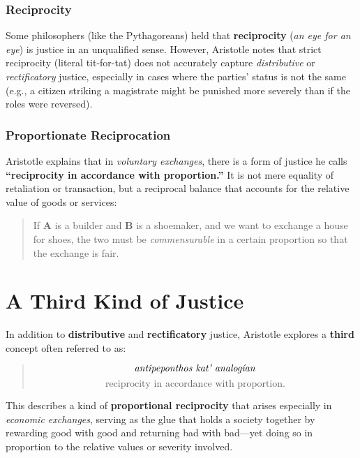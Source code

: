                 \subsubsection{Reciprocity}

                    Some philosophers (like the Pythagoreans) held that \textbf{reciprocity} (\emph{an eye for an eye}) is justice in an unqualified sense. However, Aristotle notes that strict reciprocity (literal tit-for-tat) does not accurately capture \textit{distributive} or \textit{rectificatory} justice, especially in cases where the parties' status is not the same (e.g., a citizen striking a magistrate might be punished more severely than if the roles were reversed).

                \subsubsection{Proportionate Reciprocation}\label{L1.2:Proportionate_Reciprocation}
                
                    Aristotle explains that in \textit{voluntary exchanges}, there is a form of justice he calls \textbf{``reciprocity in accordance with proportion.''} It is not mere equality of retaliation or transaction, but a reciprocal balance that accounts for the relative value of goods or services:
                    
                    \begin{quote}
                    If \textbf{A} is a builder and \textbf{B} is a shoemaker, and we want to exchange a house for shoes, the two must be \textit{commensurable} in a certain proportion so that the exchange is fair.
                    \end{quote}

        \section{A Third Kind of Justice}

            In addition to \textbf{distributive} and \textbf{rectificatory} justice, Aristotle explores a \textbf{third} concept often referred to as:
            \begin{quote}
            \[
            \text{\textit{antipeponthos kat' analogían}}
            \]
            \[
            \text{reciprocity in accordance with proportion.}
            \]
            \end{quote}

            This describes a kind of \textbf{proportional reciprocity} that arises especially in \textit{economic exchanges}, serving as the glue that holds a society together by rewarding good with good and returning bad with bad---yet doing so in proportion to the relative values or severity involved.

